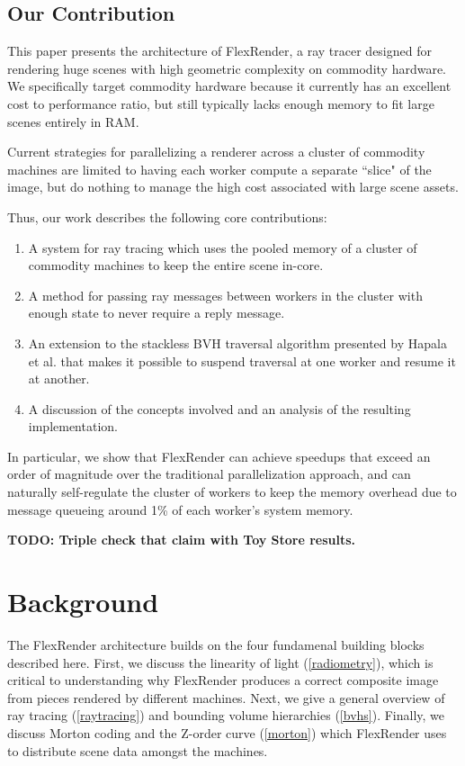 \documentclass[12pt]{ucthesis}
\begin{document}
\section{Our Contribution}
\label{contribution}

This paper presents the architecture of FlexRender, a ray tracer designed for
rendering huge scenes with high geometric complexity on commodity hardware. We
specifically target commodity hardware because it currently has an excellent
cost to performance ratio, but still typically lacks enough memory to fit large
scenes entirely in RAM.

Current strategies for parallelizing a renderer across a cluster of commodity
machines are limited to having each worker compute a separate ``slice" of the
image, but do nothing to manage the high cost associated with large scene
assets.

Thus, our work describes the following core contributions:

\begin{enumerate}
    \item A system for ray tracing which uses the pooled memory of a cluster of
        commodity machines to keep the entire scene in-core.
    \item A method for passing ray messages between workers in the cluster with
        enough state to never require a reply message.
    \item An extension to the stackless BVH traversal algorithm presented by
        Hapala et al. \cite{hapala:2011} that makes it possible to suspend
        traversal at one worker and resume it at another.
    \item A discussion of the concepts involved and an analysis of the resulting
        implementation.
\end{enumerate}

In particular, we show that FlexRender can achieve speedups that exceed an
order of magnitude over the traditional parallelization approach, and can
naturally self-regulate the cluster of workers to keep the memory overhead due
to message queueing around 1\% of each worker's system memory.

\textbf{TODO: Triple check that claim with Toy Store results.}

\chapter{Background}
\label{background}

The FlexRender architecture builds on the four fundamenal building blocks
described here. First, we discuss the linearity of light (\ref{radiometry}),
which is critical to understanding why FlexRender produces a correct composite
image from pieces rendered by different machines. Next, we give a general
overview of ray tracing (\ref{raytracing}) and bounding volume hierarchies
(\ref{bvhs}). Finally, we discuss Morton coding and the Z-order curve
(\ref{morton}) which FlexRender uses to distribute scene data amongst the
machines.
\end{document}
